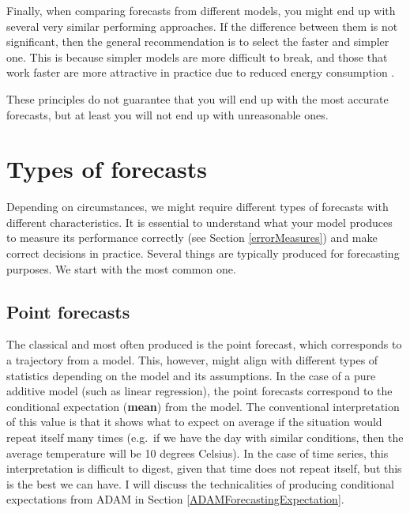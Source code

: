 \documentclass[
]{book}
\theoremstyle{definition}
\theoremstyle{definition}
\theoremstyle{definition}
\theoremstyle{definition}
\theoremstyle{remark}
\begin{document}
Finally, when comparing forecasts from different models, you might end up with several very similar performing approaches. If the difference between them is not significant, then the general recommendation is to select the faster and simpler one. This is because simpler models are more difficult to break, and those that work faster are more attractive in practice due to reduced energy consumption \citep[save the planet and stop global warming!][]{Dhar2020}.

These principles do not guarantee that you will end up with the most accurate forecasts, but at least you will not end up with unreasonable ones.

\hypertarget{typesOfForecasts}{%
\section{Types of forecasts}\label{typesOfForecasts}}

Depending on circumstances, we might require different types of forecasts with different characteristics. It is essential to understand what your model produces to measure its performance correctly (see Section \ref{errorMeasures}) and make correct decisions in practice. Several things are typically produced for forecasting purposes. We start with the most common one.

\hypertarget{typesOfForecastsPoint}{%
\subsection{Point forecasts}\label{typesOfForecastsPoint}}

The classical and most often produced is the point forecast, which corresponds to a trajectory from a model. This, however, might align with different types of statistics depending on the model and its assumptions. In the case of a pure additive model (such as linear regression), the point forecasts correspond to the conditional expectation (\textbf{mean}) from the model. The conventional interpretation of this value is that it shows what to expect on average if the situation would repeat itself many times (e.g.~if we have the day with similar conditions, then the average temperature will be 10 degrees Celsius). In the case of time series, this interpretation is difficult to digest, given that time does not repeat itself, but this is the best we can have. I will discuss the technicalities of producing conditional expectations from ADAM in Section \ref{ADAMForecastingExpectation}.
\end{document}
